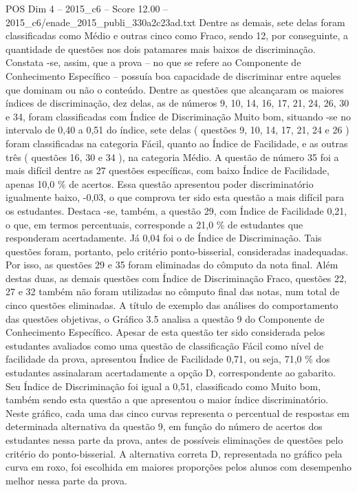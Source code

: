 \begin{textsample}{POS Dim 4 – 2015\_c6 – Score 12.00 – 2015\_c6/enade\_2015\_publi\_330a2c23ad.txt}
Dentre as demais, sete delas foram classificadas como Médio e outras cinco como Fraco, sendo 12, por conseguinte, a quantidade de questões nos dois patamares mais baixos de discriminação.
Constata -se, assim, que a prova – no que se refere ao Componente de Conhecimento Específico – possuía boa capacidade de discriminar entre aqueles que dominam ou não o conteúdo.
Dentre as questões que alcançaram os maiores índices de discriminação, dez delas, as de números 9, 10, 14, 16, 17, 21, 24, 26, 30 e 34, foram classificadas com Índice de Discriminação Muito bom, situando -se no intervalo de 0,40 a 0,51 do índice, sete delas ( questões 9, 10, 14, 17, 21, 24 e 26 ) foram classificadas na categoria Fácil, quanto ao Índice de Facilidade, e as outras três ( questões 16, 30 e 34 ), na categoria Médio.
A questão de número 35 foi a mais difícil dentre as 27 questões específicas, com baixo Índice de Facilidade, apenas 10,0 \% de acertos.
Essa questão apresentou poder discriminatório igualmente baixo, -0,03, o que comprova ter sido esta questão a mais difícil para os estudantes.
Destaca -se, também, a questão 29, com Índice de Facilidade 0,21, o que, em termos percentuais, corresponde a 21,0 \% de estudantes que responderam acertadamente.
Já 0,04 foi o de Índice de Discriminação.
Tais questões foram, portanto, pelo critério ponto-bisserial, consideradas inadequadas.
Por isso, as questões 29 e 35 foram eliminadas do cômputo da nota final.
Além destas duas, as demais questões com Índice de Discriminação Fraco, questões 22, 27 e 32 também não foram utilizadas no cômputo final das notas, num total de cinco questões eliminadas.
A título de exemplo das análises do comportamento das questões objetivas, o Gráfico 3.5 analisa a questão 9 do Componente de Conhecimento Específico.
Apesar de esta questão ter sido considerada pelos estudantes avaliados como uma questão de classificação Fácil como nível de facilidade da prova, apresentou Índice de Facilidade 0,71, ou seja, 71,0 \% dos estudantes assinalaram acertadamente a opção D, correspondente ao gabarito.
Seu Índice de Discriminação foi igual a 0,51, classificado como Muito bom, também sendo esta questão a que apresentou o maior índice discriminatório.
Neste gráfico, cada uma das cinco curvas representa o percentual de respostas em determinada alternativa da questão 9, em função do número de acertos dos estudantes nessa parte da prova, antes de possíveis eliminações de questões pelo critério do ponto-bisserial.
A alternativa correta D, representada no gráfico pela curva em roxo, foi escolhida em maiores proporções pelos alunos com desempenho melhor nessa parte da prova.

\end{textsample}

